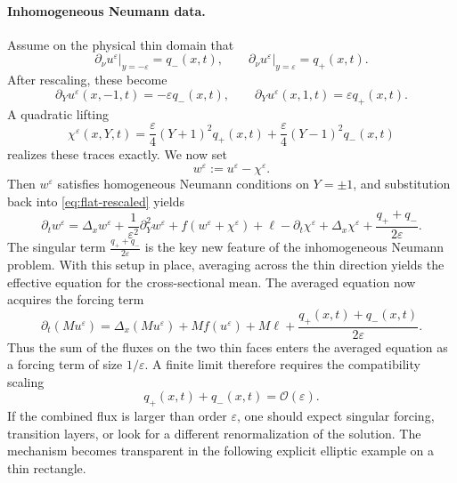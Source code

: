 \documentclass[11pt]{article}
\theoremstyle{definition}
\theoremstyle{remark}
\numberwithin{equation}{section}
\newcommand{\eps}{\varepsilon}
\newcommand{\mc}[1]{\mathcal{#1}}
\begin{document}
\paragraph{Inhomogeneous Neumann data.}
Assume on the physical thin domain that
\[
\partial_\nu  u^\eps\big|_{y=-\eps}=q_-(x,t),
\qquad
\partial_\nu  u^\eps\big|_{y=\eps}=q_+(x,t).
\]
After rescaling, these become
\[
\partial_Yu^\eps(x,-1,t)=-\eps q_-(x,t),
\qquad
\partial_Yu^\eps(x,1,t)=\eps q_+(x,t).
\]
A quadratic lifting
\[
\chi^\eps(x,Y,t)=\frac\eps4(Y+1)^2q_+(x,t)+\frac\eps4(Y-1)^2q_-(x,t)
\]
realizes these traces exactly.
We now set
\begin{equation*}
w^\varepsilon:=u^\varepsilon-\chi^\varepsilon.
\end{equation*}
Then $w^\varepsilon$ satisfies homogeneous Neumann conditions on $Y=\pm1$, and substitution back into \eqref{eq:flat-rescaled} yields
\begin{equation}\label{eq:remainder-neumann-raw}
\partial_t w^\varepsilon
=
\Delta_x w^\varepsilon+\frac1{\varepsilon^2}\partial_Y^2w^\varepsilon
+f(w^\varepsilon+\chi^\varepsilon)+\ell-\partial_t \chi^\varepsilon+\Delta_x \chi^\varepsilon
+\frac{q_++q_-}{2\varepsilon}.
\end{equation}
The singular term $\frac{q_++q_-}{2\varepsilon}$ is the key new feature of the inhomogeneous Neumann problem.
With this setup in place, averaging across the thin direction yields the effective equation for the cross-sectional mean.
The averaged equation now acquires the forcing term
\begin{equation}\label{eq:neumann-general-avg}
\partial_t(Mu^\eps)=\Delta_x(Mu^\eps)+M f(u^\eps)+M\ell+\frac{q_+(x,t)+q_-(x,t)}{2\eps}.
\end{equation}
Thus the sum of the fluxes on the two thin faces enters the averaged equation as a forcing term of size $1/\varepsilon$.
A finite limit therefore requires the compatibility scaling
\[
q_+(x,t)+q_-(x,t)=\mc O(\eps).
\]
If the combined flux is larger than order $\eps$, one should expect singular forcing, transition layers, or look for a different renormalization of the solution. The mechanism becomes transparent in the following explicit elliptic example on a thin rectangle.
\end{document}
